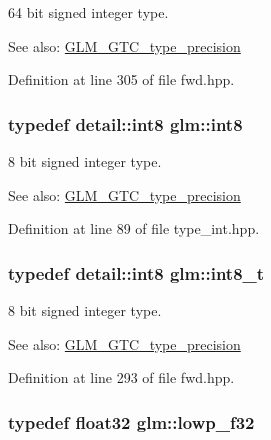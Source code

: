 64 bit signed integer type. \begin{Desc}
\item[See also:]\hyperlink{group__gtc__type__precision}{GLM\_\-GTC\_\-type\_\-precision} \end{Desc}


Definition at line 305 of file fwd.hpp.\hypertarget{group__gtc__type__precision_g96254f9c1c4506fc8eb5cf3301ce8565}{
\subsubsection[int8]{\setlength{\rightskip}{0pt plus 5cm}typedef detail::int8 {\bf glm::int8}}}
\label{group__gtc__type__precision_g96254f9c1c4506fc8eb5cf3301ce8565}


8 bit signed integer type. \begin{Desc}
\item[See also:]\hyperlink{group__gtc__type__precision}{GLM\_\-GTC\_\-type\_\-precision} \end{Desc}


Definition at line 89 of file type\_\-int.hpp.\hypertarget{group__gtc__type__precision_g673898d450b2a91186f3c4f40c5f8633}{
\subsubsection[int8\_\-t]{\setlength{\rightskip}{0pt plus 5cm}typedef detail::int8 {\bf glm::int8\_\-t}}}
\label{group__gtc__type__precision_g673898d450b2a91186f3c4f40c5f8633}


8 bit signed integer type. \begin{Desc}
\item[See also:]\hyperlink{group__gtc__type__precision}{GLM\_\-GTC\_\-type\_\-precision} \end{Desc}


Definition at line 293 of file fwd.hpp.\hypertarget{group__gtc__type__precision_g1b9734de4b4429dc26b1454a2a399b05}{
\subsubsection[lowp\_\-f32]{\setlength{\rightskip}{0pt plus 5cm}typedef float32 {\bf glm::lowp\_\-f32}}}
\label{group__gtc__type__precision_g1b9734de4b4429dc26b1454a2a399b05}


